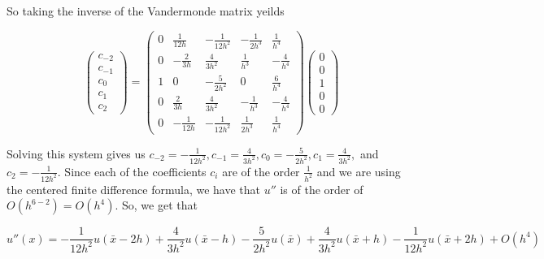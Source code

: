 \begin{solution}
    So taking the inverse of the Vandermonde matrix yeilds
    
    $$\left(\begin{array}{c} c_{-2}\\ c_{-1}\\ c_0\\ c_1\\ c_2 \end{array}\right)
    =\left(\begin{array}{ccccc} 0 & \frac{1}{12h} & -\frac{1}{12h^2} & -\frac{1}{2h^3} & \frac{1}{h^4}
                             \\ 0 & -\frac{2}{3h} & \frac{4}{3h^2} & \frac{1}{h^3} & -\frac{4}{h^4}
                             \\ 1 & 0 & -\frac{5}{2h^2} & 0 & \frac{6}{h^4}
                             \\ 0 & \frac{2}{3h} & \frac{4}{3h^2} & -\frac{1}{h^3} & -\frac{4}{h^4}
                             \\ 0 & -\frac{1}{12h} & -\frac{1}{12h^2} & \frac{1}{2h^3} & \frac{1}{h^4} 
     \end{array}\right) \left(\begin{array}{c} 0\\ 0\\ 1\\ 0\\ 0 \end{array}\right)$$
     
     Solving this system gives us $c_{-2}=-\frac{1}{12h^2}, c_{-1}=\frac{4}{3h^2}, c_0=-\frac{5}{2h^2},
     c_1=\frac{4}{3h^2},$ and $c_2=-\frac{1}{12h^2}$. Since  each of the coefficients $c_i$ are of the
     order $\frac{1}{h^2}$ and we are using the centered finite difference formula, we have that $u''$
     is of the order of $O(h^{6-2})=O(h^4)$. So, we get that 
     
     $$u''(x)=-\frac{1}{12h^2}u(\bar{x}-2h)+\frac{4}{3h^2}u(\bar{x}-h)-\frac{5}{2h^2}u(\bar{x})+
     \frac{4}{3h^2}u(\bar{x}+h)-\frac{1}{12h^2}u(\bar{x}+2h)+O(h^4)$$

\end{solution}